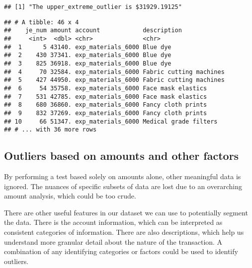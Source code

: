 \documentclass[
]{book}
\newenvironment{Shaded}{\begin{snugshade}}{\end{snugshade}}
\newcommand{\KeywordTok}[1]{\textcolor[rgb]{0.13,0.29,0.53}{\textbf{#1}}}
\newcommand{\NormalTok}[1]{#1}
\newcommand{\OperatorTok}[1]{\textcolor[rgb]{0.81,0.36,0.00}{\textbf{#1}}}
\newcommand{\StringTok}[1]{\textcolor[rgb]{0.31,0.60,0.02}{#1}}
\begin{document}
\begin{verbatim}
## [1] "The upper_extreme_outlier is $31929.19125"
\end{verbatim}

\begin{Shaded}
\end{Shaded}

\begin{verbatim}
## # A tibble: 46 x 4
##    je_num amount account            description            
##     <int>  <dbl> <chr>              <chr>                  
##  1      5 43140. exp_materials_6000 Blue dye               
##  2    430 37341. exp_materials_6000 Blue dye               
##  3    825 36918. exp_materials_6000 Blue dye               
##  4     70 32584. exp_materials_6000 Fabric cutting machines
##  5    427 44950. exp_materials_6000 Fabric cutting machines
##  6     54 35758. exp_materials_6000 Face mask elastics     
##  7    531 42785. exp_materials_6000 Face mask elastics     
##  8    680 36860. exp_materials_6000 Fancy cloth prints     
##  9    832 37269. exp_materials_6000 Fancy cloth prints     
## 10     66 51347. exp_materials_6000 Medical grade filters  
## # ... with 36 more rows
\end{verbatim}

\hypertarget{outliers-based-on-amounts-and-other-factors}{%
\subsection{Outliers based on amounts and other factors}\label{outliers-based-on-amounts-and-other-factors}}

By performing a test based solely on amounts alone, other meaningful data is ignored. The nuances of specific subsets of data are lost due to an overarching amount analysis, which could be too crude.

There are other useful features in our dataset we can use to potentially segment the data. There is the account information, which can be interpreted as consistent categories of information. There are also descriptions, which help us understand more granular detail about the nature of the transaction. A combination of any identifying categories or factors could be used to identify outliers.
\end{document}
